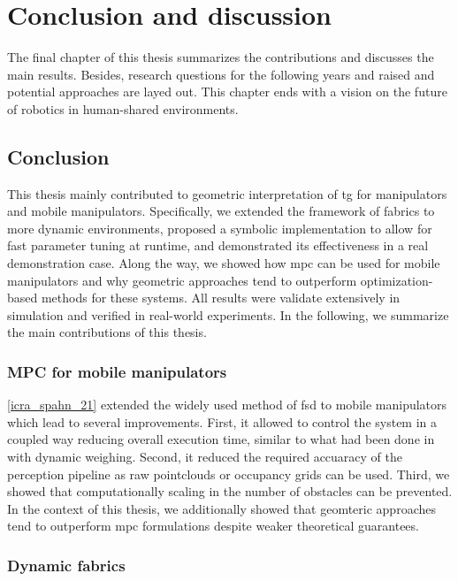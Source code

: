 \chapter{Conclusion and discussion}
\label{cha:conclusion_and_discussion}

The final chapter of this thesis summarizes the contributions and discusses the
main results. Besides, research questions for the following years and raised and
potential approaches are layed out. This chapter ends with a vision on the
future of robotics in human-shared environments.

\section{Conclusion}
\label{sec:conclusion}

This thesis mainly contributed to geometric interpretation of \ac{tg} for manipulators
and mobile manipulators. Specifically, we extended the framework of \ac{fabrics}
to more dynamic environments, proposed a symbolic implementation to allow for
fast parameter tuning at runtime, and demonstrated its effectiveness in
a real demonstration case. Along the way, we showed how \ac{mpc} can be used for
mobile manipulators and why geometric approaches tend to outperform
optimization-based methods for these systems. All results were validate
extensively in simulation and verified in real-world experiments.
In the following, we summarize the main contributions of this thesis.

\subsection{MPC for mobile manipulators}
\label{sec:conclusion_mpc}

\cref{icra_spahn_21} extended the widely used method of \ac{fsd} to mobile
manipulators which lead to several improvements. First, it allowed to control
the system in a coupled way reducing overall execution time, similar to what had
been done in \cite{Avanzini2018} with dynamic weighing. Second, it reduced the
required accuaracy of the perception pipeline as raw pointclouds or occupancy
grids can be used. Third, we showed that computationally scaling in the number
of obstacles can be prevented. In the context of this thesis, we additionally
showed that geomteric approaches tend to outperform \ac{mpc} formulations
despite weaker theoretical guarantees.

\subsection{Dynamic fabrics}
\label{sec:conclusion_dynamic_fabrics}

